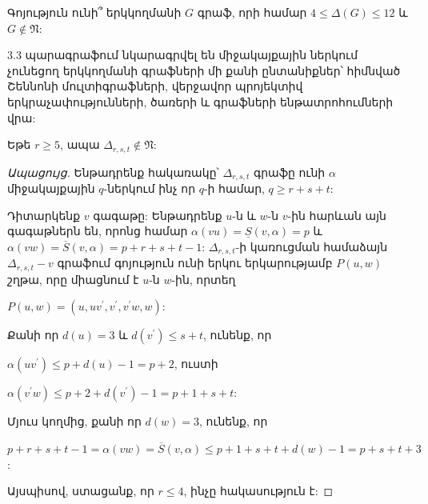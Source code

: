 \begin{problem}
Գոյություն ունի՞ երկկողմանի $G$ գրաֆ, որի համար $4\leq \Delta(G)\leq 12$ և
$G\notin \mathfrak{N}$:
\end{problem}

3.3 պարագրաֆում նկարագրվել են միջակայքային ներկում չունեցող երկկողմանի գրաֆների մի քանի ընտանիքներ՝ հիմնված Շեննոնի մուլտիգրաֆների, վերջավոր պրոյեկտիվ երկրաչափությունների, ծառերի և գրաֆների ենթատրոհումների վրա:

\begin{hide}
\begin{theorem}
\label{t3_Shannon} Եթե $r\geq 5$, ապա $\Delta_{r,s,t}\notin
\mathfrak{N}$:
\end{theorem}
\begin{proof}[Ապացույց]
Ենթադրենք հակառակը՝ $\Delta_{r,s,t}$ գրաֆը ունի  $\alpha$ միջակայքային $q$-ներկում ինչ որ $q$-ի համար, $q\geq r+s+t$:

Դիտարկենք $v$ գագաթը: Ենթադրենք $u$-ն և $w$-ն $v$-ին հարևան այն գագաթներն են, որոնց համար $\alpha(vu)=\underline{S}(v,\alpha)=p$ և
$\alpha(vw)=\overline{S}(v,\alpha)=p+r+s+t-1$: 
$\Delta_{r,s,t}$-ի կառուցման համաձայն $\Delta_{r,s,t}-v$ գրաֆում գոյություն ունի երկու երկարությամբ $P(u,w)$ շղթա, որը միացնում է $u$-ն  $w$-ին, որտեղ
\begin{center}
$P(u,w)=(u,uv^{\prime},v^{\prime},v^{\prime}w,w)$:
\end{center}

Քանի որ $d(u)=3$ և $d(v^{\prime})\leq s+t$, ունենք, որ

\begin{center}
$\alpha(uv^{\prime})\leq p+d(u)-1=p+2$, ուստի
\end{center}
\begin{center}
$\alpha(v^{\prime}w)\leq p+2+ d(v^{\prime})-1=p+1+s+t$:
\end{center}

Մյուս կողմից, քանի որ $d(w)=3$, ունենք, որ

\begin{center}
$p+r+s+t-1=\alpha(vw)=\overline{S}(v,\alpha)\leq p+1+s+t+d(w)-1=p+s+t+3$:
\end{center}
Այսպիսով, ստացանք, որ $r\leq 4$, ինչը հակասություն է:
\end{proof}


\end{hide}
